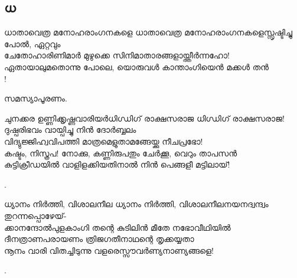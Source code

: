 \subsection{ധ}
\begin{enumerate}

\begin{slokam}{\VSv}{\UN}{ധാതാവെത്ര മനോഹരാംഗനകളെ}
ധാതാവെത്ര മനോഹരാംഗനകളെസ്സൃഷ്ടിച്ചു പോൽ, ഏറ്റവും\\
ചേതോഹാരിണിമാർ മുഴുക്കെ സിനിമാതാരങ്ങളായ്ത്തീർന്നഹോ!\\
ഏതായാലുമതൊന്നു പോലെ, യൊരുവൾ കാന്താംഗിയെൻ മക്കൾ തൻ\\
!
\end{slokam}




സമസ്യാപൂരണം. 



\begin{slokam}{\VSv}{ചുനക്കര ഉണ്ണിക്കൃഷ്ണവാരിയർ}{ധിഗ്ധിഗ്‌ രാക്ഷസരാജ}
ധിഗ്ധിഗ്‌ രാക്ഷസരാജ! ദുഷ്പരിഭവം വായ്പിച്ചു നിന്‍ ദോര്‍ബ്ബലം\\
വിദ്യുജ്ജിഹ്വവിപത്തി മാത്രമെളുതാമങ്ങേയ്ക്കു നീചപ്രഭോ!\\
കഷ്ടം, നിസ്ത്രപ! നോക്കു, കണ്ണിരുപതും ചേര്‍ക്കൂ, വെറും താപസന്‍\\
കുട്ടിക്രീഡയില്‍ വാളിളക്കിയതിനാല്‍ നിന്‍ പെങ്ങളീ മട്ടിലായ്‌!
\end{slokam}


.

\begin{slokam}{\VSv}{\VNM}{ധ്യാനം നിർത്തി, വിശാലനീല}
 ധ്യാനം നിർത്തി, വിശാലനീലനയനദ്വന്ദ്വം തുറന്നപ്പൊഴേയ്‌-\\
ക്കാനന്ദോൽപുളകാംഗി തന്റെ കുടിലിൻ മീതേ നഭോവീഥിയിൽ\\
ദീനത്രാണപരായണം ത്രിജഗതീനാഥന്റെ തൃക്കയ്യതാ\\
നൂനം വാരി വിതച്ചിടുന്നു വളരെസ്സൗവർണ്യനാണ്യങ്ങളെ!
\end{slokam}


.


\end{enumerate}

